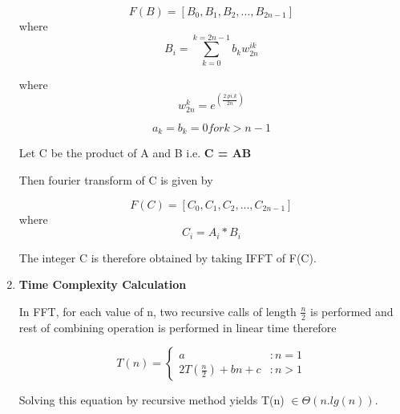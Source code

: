 \documentclass[a4paper,11pt]{article}
\begin{document}
\begin{enumerate}
\begin{equation}
F(B) = [B_{0}, B_{1}, B_{2}, ..., B_{2n-1}]\end{equation} where \begin{equation}
B_i = \sum_{k=0}^{k=2n-1} b_{k}w_{2n}^{ik}\end{equation}

where \begin{equation}
w_{2n}^k = e^(\frac{2.pi.k}{2n}) \end{equation}

\begin{equation}
a_{k} = b_{k} = 0 for k > n-1 \end{equation}

Let C be the product of A and B i.e. \textbf{C = AB}

Then fourier transform of C is given by

\begin{equation}
F(C) = [C_{0}, C_{1}, C_{2}, ..., C_{2n-1}] \end{equation} where \begin{equation}
C_i = A_i * B_i\end{equation}

The integer C is therefore obtained by taking IFFT of F(C).

\item \textbf{Time Complexity Calculation}

In FFT, for each value of n, two recursive calls of length $\frac{n}{2}$ is performed and rest of combining operation is performed in linear time therefore

 \begin{displaymath}   T(n) = \left\{
     \begin{array}{lr}
       a & : n = 1\\
       2T(\frac{n}{2}) + bn +c & : n > 1
     \end{array}
   \right.
\end{displaymath}

Solving this equation by recursive method yields T(n) $\in \Theta (n.lg(n))$.
 
\end{enumerate}
\end{document}
